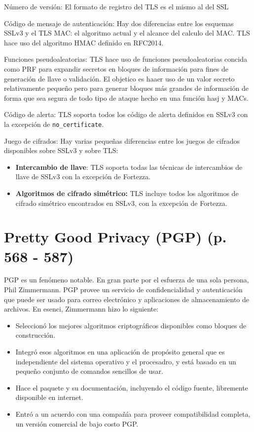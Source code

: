\documentclass[11pt,letterpaper]{article}
\begin{document}
Número de versión:
El formato de registro del TLS es el mismo al del SSL 

Código de mensaje de autenticación:
Hay dos diferencias entre los esquemas SSLv3 y el TLS MAC: el algoritmo actual y el alcance del
calculo del MAC. TLS hace uso del algoritmo HMAC definido en RFC2014.

Funciones pseudoaleatorias:
TLS hace uso de funciones pseudoaleatorias concida como PRF para expandir secretos en bloques
de información para fines de generación de llave o validación. El objetico es haaer uso de
un valor secreto relativamente pequeño pero para generar bloques más grandes de información
de forma que sea segura de todo tipo de ataque hecho en una función hasj y MACs.

Código de alerta:
TLS soporta todos los código de alerta definidos en SSLv3 con la excepción de \texttt{no\_certificate}.

Juego de cifrados:
Hay varias pequeñas diferencias entre los juegos de cifrados disponibles sobre SSLv3 y sobre TLS:
\begin{itemize}
    \item \textbf{Intercambio de llave}: TLS soporta todas las técnicas de intercambios de llave de SSLv3
    con la excepción de Fortezza.
    \item \textbf{Algoritmos de cifrado simétrico:} TLS incluye todos los algoritmos de cifrado simétrico 
    encontrados en SSLv3, con la excepción de Fortezza.
\end{itemize}


\section{Pretty Good Privacy (PGP) (p. 568 - 587)}
PGP es un fenómeno notable. En gran parte por el esfuerza de una sola persona, Phil Zimmermann. PGP
provee un servicio de confidencialidad y autenticación que puede ser usado para correo electrónico
y aplicaciones de almacenamiento de archivos. En esenci, Zimmermann hizo lo siguiente:

\begin{itemize}
    \item Seleccionó los mejores algoritmos criptográficos disponibles como bloques de construcción.
    \item Integró esos algoritmos en una aplicación de propósito general que es independiente del 
    sistema operativo y el procesadro, y está basado en un pequeño conjunto de comandos sencillos
    de usar.
    \item Hace el paquete y su documentación, incluyendo el código fuente, libremente disponible en internet.
    \item Entró a un acuerdo con una compañía para proveer compatibilidad completa, un versión
    comercial de bajo costo PGP.
\end{itemize}
\end{document}
